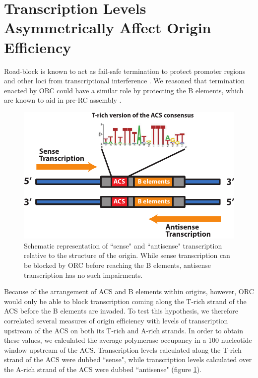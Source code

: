 \singlespacing
\section{Transcription Levels Asymmetrically Affect Origin Efficiency}
\doublespacing

Road-block is known to act as fail-safe termination to protect promoter regions and other loci from transcriptional interference \cite{colin:2014:roadblock}. 
We reasoned that termination enacted by ORC could have a similar role by protecting the B elements, which are known to aid in pre-RC assembly \cite{wilmes:2002:b2}. 
\begin{figure}[h]

\centering
\includegraphics[width=\textwidth]{figures/results/senseAntisenseSchema}
\caption[Cartoon of sense and antisense transcription relative to the ACS]{Schematic representation of ``sense" and ``antisense" transcription relative to the structure of the origin. While sense transcription can be blocked by ORC before reaching the B elements, antisense transcription has no such impairments.}
\label{fig:senseAntisense}

\end{figure}  
Because of the arrangement of ACS and B elements within origins, however, ORC would only be able to block transcription coming along the T-rich strand of the ACS before the B elements are invaded. To test this hypothesis, we therefore correlated several measures of origin efficiency with levels of transcription upstream of the ACS on both its T-rich and A-rich strands. 
In order to obtain these values, we calculated the average polymerase occupancy in a 100 nucleotide window upstream of the ACS. Transcription levels calculated along the T-rich strand of the ACS were dubbed ``sense", while transcription levels calculated over the A-rich strand of the ACS were dubbed ``antisense" (figure \ref{fig:senseAntisense}).



